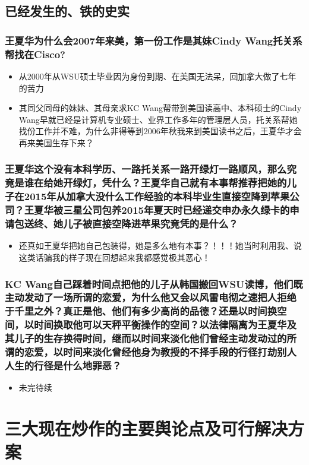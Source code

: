 \documentclass[9pt, b5paper]{article}
\begin{document}
\subsection{已经发生的、铁的史实}
\label{sec-6-1}
\subsubsection{王夏华为什么会2007年来美，第一份工作是其妹Cindy Wang托关系帮找在Cisco?}
\label{sec-6-1-1}
\begin{itemize}
\item 从2000年从WSU硕士毕业因为身份到期、在美国无法呆，回加拿大做了七年的苦力
\item 其同父同母的妹妹、其母亲求KC Wang帮带到美国读高中、本科硕士的Cindy Wang早就已经是计算机专业硕士、业界工作多年的管理层人员，托关系帮她找份工作并不难，为什么非得等到2006年秋我来到美国读书之后，王夏华才会再来美国生存下来？
\end{itemize}
\subsubsection{王夏华这个没有本科学历、一路托关系一路开绿灯一路顺风，那么究竟是谁在给她开绿灯，凭什么？王夏华自己就有本事帮推荐把她的儿子在2015年从加拿大没什么工作经验的本科毕业生直接空降到苹果公司？王夏华被三星公司包养2015年夏天时已经递交申办永久绿卡的申请包送终、她儿子被直接空降进苹果究竟凭的是什么？}
\label{sec-6-1-2}
\begin{itemize}
\item 还真如王夏华把她自己包装得，她是多么地有本事？！！！她当时利用我、说这类话骗我的样子现在回想起来我都感觉极其恶心！
\end{itemize}
\subsubsection{KC Wang自己踩着时间点把他的儿子从韩国搬回WSU读博，他们既主动发动了一场所谓的恋爱，为什么他又会以风雷电彻之速把人拒绝于千里之外？真正是他、他们有多少高尚的品德？还是以时间换空间，以时间换取他可以天秤平衡操作的空间？以法律隔离为王夏华及其儿子的生存换得时间，继而以时间来淡化他们曾经主动发动过的所谓的恋爱，以时间来淡化曾经他身为教授的不择手段的行径打劫别人人生的行径是什么地罪恶？}
\label{sec-6-1-3}
\begin{itemize}
\item 未完待续
\end{itemize}


\section{三大现在炒作的主要舆论点及可行解决方案}
\label{sec-7}
\end{document}
